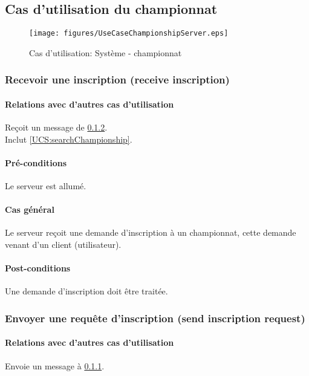 
\subsection{Cas d'utilisation du championnat}

\begin{figure}[h]
  \centering
  \texttt{[image: figures/UseCaseChampionshipServer.eps]}
  \caption{\label{fig:UCS:championshipManagement}Cas d'utilisation: Système - championnat}
\end{figure}

\subsubsection{Recevoir une inscription (receive inscription)}
\label{UCS:receiveInscription}
\paragraph{Relations avec d'autres cas d'utilisation}
Reçoit un message de \ref{UCS:sendInscription}.\\
Inclut \ref{UCS:searchChampionship}.
\paragraph{Pré-conditions}
\begin{list}{}{\leftmargin=1.5em}
\item{Le serveur est allumé.}
\end{list}
\paragraph{Cas général}
Le serveur reçoit une demande d'inscription à un championnat, cette demande venant d'un client (utilisateur).
\paragraph{Post-conditions}
\begin{list}{}{\leftmargin=1.5em}
\item{Une demande d'inscription doit être traitée.}
\end{list}

\subsubsection{Envoyer une requête d'inscription (send inscription request)}
\label{UCS:sendInscription}
\paragraph{Relations avec d'autres cas d'utilisation}
Envoie un message à \ref{UCS:receiveInscription}.
